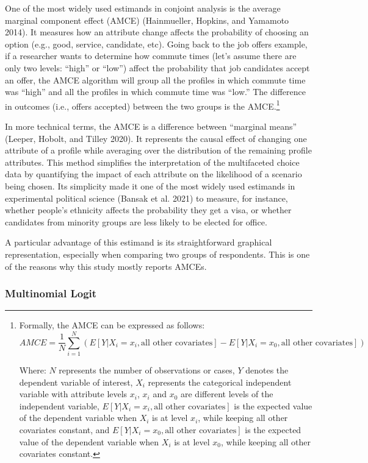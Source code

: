 \documentclass[
  12pt,
]{article}
\begin{document}
One of the most widely used estimands in conjoint analysis is the average marginal component effect (AMCE) (Hainmueller, Hopkins, and Yamamoto 2014). It measures how an attribute change affects the probability of choosing an option (e.g., good, service, candidate, etc). Going back to the job offers example, if a researcher wants to determine how commute times (let's assume there are only two levels: ``high'' or ``low'') affect the probability that job candidates accept an offer, the AMCE algorithm will group all the profiles in which commute time was ``high'' and all the profiles in which commute time was ``low.'' The difference in outcomes (i.e., offers accepted) between the two groups is the AMCE.\footnote{Formally, the AMCE can be expressed as follows:\[AMCE = \frac{1}{N} \sum_{i=1}^{N} (E[Y|X_i=x_i, \text{all other covariates}] - E[Y|X_i=x_0, \text{all other covariates}])\]

  Where: \(N\) represents the number of observations or cases, \(Y\) denotes the dependent variable of interest, \(X_i\) represents the categorical independent variable with attribute levels \(x_i\), \(x_i\) and \(x_0\) are different levels of the independent variable, \(E[Y|X_i=x_i, \text{all other covariates}]\) is the expected value of the dependent variable when \(X_i\) is at level \(x_i\), while keeping all other covariates constant, and \(E[Y|X_i=x_0, \text{all other covariates}]\) is the expected value of the dependent variable when \(X_i\) is at level \(x_0\), while keeping all other covariates constant.}

In more technical terms, the AMCE is a difference between ``marginal means'' (Leeper, Hobolt, and Tilley 2020). It represents the causal effect of changing one attribute of a profile while averaging over the distribution of the remaining profile attributes. This method simplifies the interpretation of the multifaceted choice data by quantifying the impact of each attribute on the likelihood of a scenario being chosen. Its simplicity made it one of the most widely used estimands in experimental political science (Bansak et al. 2021) to measure, for instance, whether people's ethnicity affects the probability they get a visa, or whether candidates from minority groups are less likely to be elected for office.

A particular advantage of this estimand is its straightforward graphical representation, especially when comparing two groups of respondents. This is one of the reasons why this study mostly reports AMCEs.

\hypertarget{multinomial-logit}{%
\subsubsection{Multinomial Logit}\label{multinomial-logit}}
\end{document}

